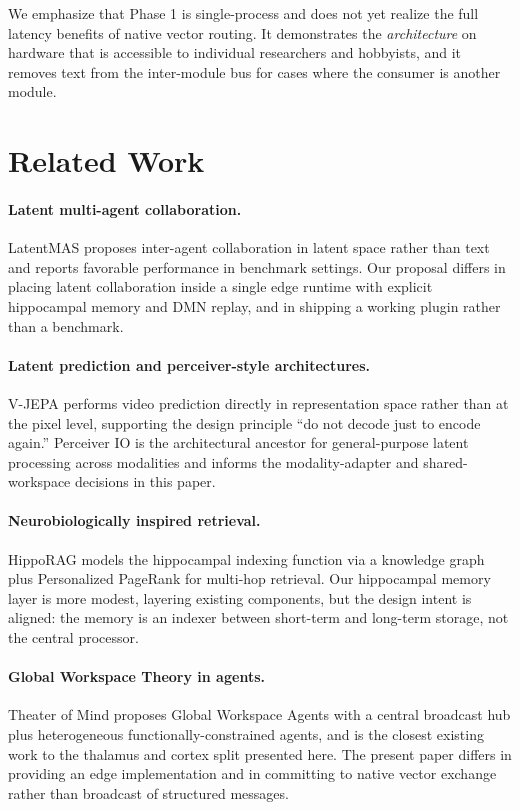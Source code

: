 \documentclass[11pt]{article}
\begin{document}
We emphasize that Phase 1 is single-process and does not yet
realize the full latency benefits of native vector routing. It
demonstrates the \emph{architecture} on hardware that is
accessible to individual researchers and hobbyists, and it
removes text from the inter-module bus for cases where the
consumer is another module.

\section{Related Work}
\label{sec:related}

\paragraph{Latent multi-agent collaboration.}
LatentMAS \cite{latentmas} proposes inter-agent collaboration in
latent space rather than text and reports favorable performance
in benchmark settings. Our proposal differs in placing latent
collaboration inside a single edge runtime with explicit
hippocampal memory and DMN replay, and in shipping a working
plugin rather than a benchmark.

\paragraph{Latent prediction and perceiver-style architectures.}
V-JEPA \cite{vjepa} performs video prediction directly in
representation space rather than at the pixel level, supporting
the design principle ``do not decode just to encode again.''
Perceiver IO \cite{perceiverio} is the architectural ancestor
for general-purpose latent processing across modalities and
informs the modality-adapter and shared-workspace decisions in
this paper.

\paragraph{Neurobiologically inspired retrieval.}
HippoRAG \cite{hipporag} models the hippocampal indexing
function via a knowledge graph plus Personalized PageRank for
multi-hop retrieval. Our hippocampal memory layer is more
modest, layering existing components, but the design intent is
aligned: the memory is an indexer between short-term and
long-term storage, not the central processor.

\paragraph{Global Workspace Theory in agents.}
Theater of Mind \cite{theaterofmind} proposes Global Workspace
Agents with a central broadcast hub plus heterogeneous
functionally-constrained agents, and is the closest existing
work to the thalamus and cortex split presented here. The
present paper differs in providing an edge implementation and
in committing to native vector exchange rather than broadcast
of structured messages.
\end{document}
